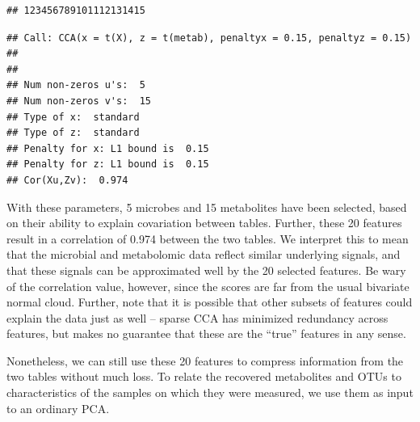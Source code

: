 \begin{knitrout}
\color{fgcolor}\begin{kframe}
\begin{alltt}
 \hlkwb{<-} \hlstd{(}    \hlstd{=} \hlstd{,}  \hlstd{=} \hlstd{)}
\end{alltt}
\begin{verbatim}
## 123456789101112131415
\end{verbatim}
\begin{alltt}
\end{alltt}
\begin{verbatim}
## Call: CCA(x = t(X), z = t(metab), penaltyx = 0.15, penaltyz = 0.15)
## 
## 
## Num non-zeros u's:  5 
## Num non-zeros v's:  15 
## Type of x:  standard 
## Type of z:  standard 
## Penalty for x: L1 bound is  0.15 
## Penalty for z: L1 bound is  0.15 
## Cor(Xu,Zv):  0.974
\end{verbatim}
\end{kframe}
\end{knitrout}

With these parameters, 5 microbes and 15 metabolites have been
selected, based on their ability to explain covariation between
tables. Further, these 20 features result in a correlation of
0.974 between the two tables. We interpret this
to mean that the microbial and metabolomic data reflect similar
underlying signals, and that these signals can be approximated well by
the 20 selected features. Be wary of the correlation value, however,
since the scores are far from the usual bivariate normal cloud.
Further, note that it is possible that other subsets of features could
explain the data just as well -- sparse CCA has minimized redundancy
across features, but makes no guarantee that these are the ``true''
features in any sense.

Nonetheless, we can still use these 20 features to compress
information from the two tables without much loss. To relate the
recovered metabolites and OTUs to characteristics of the samples on
which they were measured, we use them as input to an ordinary PCA.

